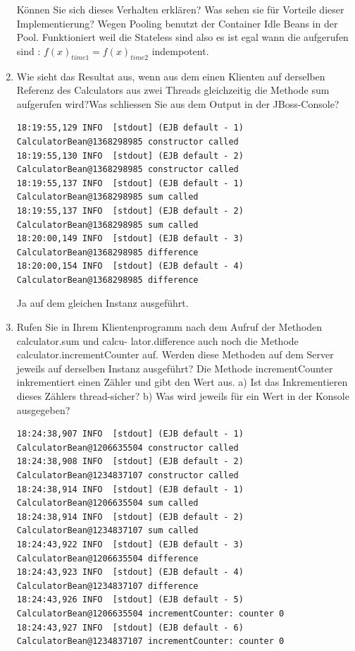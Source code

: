 \documentclass[a4paper,10pt]{scrreprt}
\begin{document}
\begin{enumerate}
\begin{lstlisting}[language={}]
      \end{lstlisting}


Können Sie sich dieses Verhalten erklären? Was sehen sie für Vorteile dieser Implementierung?
{\color{red} Wegen Pooling  benutzt der Container Idle Beans in der Pool. Funktioniert weil die Stateless sind also es 
ist egal wann die aufgerufen sind : $ f(x)_{time1} = f(x)_{time2}$ indempotent. }
\item Wie sieht das Resultat aus, wenn aus dem einen Klienten auf derselben Referenz des Calculators
aus zwei Threads gleichzeitig die Methode sum aufgerufen wird?Was schliessen Sie aus dem Output in der JBoss-Console?
\begin{lstlisting}[language={}]
 18:19:55,129 INFO  [stdout] (EJB default - 1) CalculatorBean@1368298985 constructor called
18:19:55,130 INFO  [stdout] (EJB default - 2) CalculatorBean@1368298985 constructor called
18:19:55,137 INFO  [stdout] (EJB default - 1) CalculatorBean@1368298985 sum called
18:19:55,137 INFO  [stdout] (EJB default - 2) CalculatorBean@1368298985 sum called
18:20:00,149 INFO  [stdout] (EJB default - 3) CalculatorBean@1368298985 difference
18:20:00,154 INFO  [stdout] (EJB default - 4) CalculatorBean@1368298985 difference

\end{lstlisting}
{\color{red} Ja auf dem gleichen Instanz ausgeführt.}
\item Rufen Sie in Ihrem Klientenprogramm nach dem Aufruf der Methoden calculator.sum und calcu-
lator.difference auch noch die Methode calculator.incrementCounter auf.
Werden diese Methoden auf dem Server jeweils auf derselben Instanz ausgeführt?
Die Methode incrementCounter inkrementiert einen Zähler und gibt den Wert aus.
a) Ist das Inkrementieren dieses Zählers thread-sicher?
b) Was wird jeweils für ein Wert in der Konsole ausgegeben?
\begin{lstlisting}[language={}]
 18:24:38,907 INFO  [stdout] (EJB default - 1) CalculatorBean@1206635504 constructor called
18:24:38,908 INFO  [stdout] (EJB default - 2) CalculatorBean@1234837107 constructor called
18:24:38,914 INFO  [stdout] (EJB default - 1) CalculatorBean@1206635504 sum called
18:24:38,914 INFO  [stdout] (EJB default - 2) CalculatorBean@1234837107 sum called
18:24:43,922 INFO  [stdout] (EJB default - 3) CalculatorBean@1206635504 difference
18:24:43,923 INFO  [stdout] (EJB default - 4) CalculatorBean@1234837107 difference
18:24:43,926 INFO  [stdout] (EJB default - 5) CalculatorBean@1206635504 incrementCounter: counter 0
18:24:43,927 INFO  [stdout] (EJB default - 6) CalculatorBean@1234837107 incrementCounter: counter 0


\end{lstlisting}
\end{enumerate}
\end{document}
